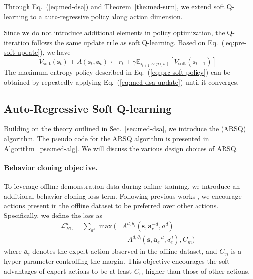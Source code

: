 Through Eq.~(\ref{eq:med-dsa}) and Theorem~\ref{the:med-sum}, we extend soft Q-learning to a auto-regressive policy along action dimension.

Since we do not introduce additional elements in policy optimization, the Q-iteration follows the same update rule as soft Q-learning.
Based on Eq.~(\ref{eq:pre-soft-update}), we have
\begin{equation}
\label{eq:med-dsa-update}
    V_{\text{soft}}(\mathbf{s}_t) + A(\mathbf{s}_t, \mathbf{a}_t) 
    \leftarrow r_t + \gamma \mathbb{E}_{\mathbf{s}_{t+1} \sim p(s)} \left[ V_{\text{soft}}(\mathbf{s}_{t+1}) \right]
\end{equation}
The maximum entropy policy described in Eq.~(\ref{eq:pre-soft-policy}) can be obtained by repeatedly applying Eq.~(\ref{eq:med-dsa-update}) until it converges.

\subsection{Auto-Regressive Soft Q-learning}
\label{sec:med-alg}


Building on the theory outlined in Sec.~\ref{sec:med-dsa}, we introduce the \arsq (ARSQ) algorithm. 
The pseudo code for the ARSQ algorithm is presented in Algorithm~\ref{pse:med-alg}. 
We will discuss the various design choices of ARSQ.

\paragraph{Behavior cloning objective.}
To leverage offline demonstration data during online training, we introduce an additional behavior cloning loss term. 
Following previous works \cite{DQfD,CQN}, we encourage actions present in the offline dataset to be preferred over other actions. 
Specifically, we define the loss as
\begin{equation}
\label{eq:med-alg-bc}
\begin{aligned}
    \mathcal{L}_{BC}^{d} = \sum_{a^{d}} \max ( 
    & A^{d, \theta_i}(\mathbf{s}, \mathbf{a}^{-d}_e, a^{d}) \\ 
    & - A^{d, \theta_i}(\mathbf{s}, \mathbf{a}^{-d}_e, a_e^{d}), C_m )
\end{aligned}
\end{equation}
where $\mathbf{a}_e$ denotes the expert action observed in the offline dataset, and $C_m$ is a hyper-parameter controlling the margin. 
This objective encourages the soft advantages of expert actions to be at least $C_m$ higher than those of other actions.


